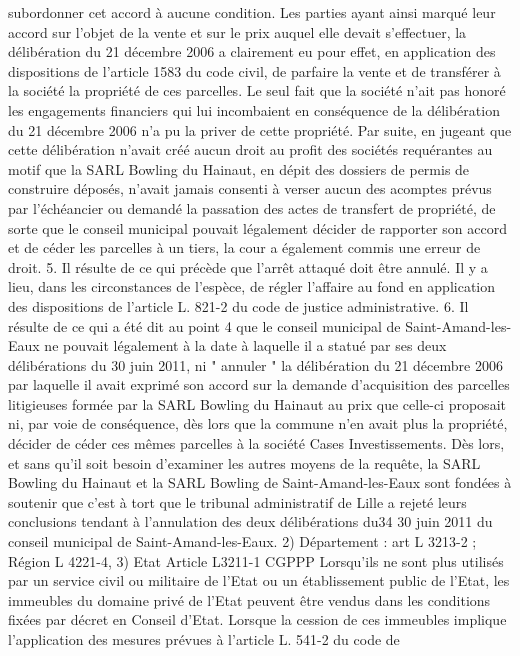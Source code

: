 \documentclass[11pt,a4paper]{report}
\begin{document}
	subordonner cet accord à aucune condition. Les parties ayant ainsi marqué leur accord sur l'objet de la vente
	et sur le prix auquel elle devait s'effectuer, la délibération du 21 décembre 2006 a clairement eu pour effet, en
	application des dispositions de l'article 1583 du code civil, de parfaire la vente et de transférer à la société la
	propriété de ces parcelles. Le seul fait que la société n'ait pas honoré les engagements financiers qui lui
	incombaient en conséquence de la délibération du 21 décembre 2006 n'a pu la priver de cette propriété. Par
	suite, en jugeant que cette délibération n'avait créé aucun droit au profit des sociétés requérantes au motif que
	la SARL Bowling du Hainaut, en dépit des dossiers de permis de construire déposés, n'avait jamais consenti à
	verser aucun des acomptes prévus par l'échéancier ou demandé la passation des actes de transfert de propriété,
	de sorte que le conseil municipal pouvait légalement décider de rapporter son accord et de céder les parcelles à
	un tiers, la cour a également commis une erreur de droit.
	5. Il résulte de ce qui précède que l'arrêt attaqué doit être annulé. Il y a lieu, dans les circonstances de l'espèce,
	de régler l'affaire au fond en application des dispositions de l'article L. 821-2 du code de justice administrative.
	6. Il résulte de ce qui a été dit au point 4 que le conseil municipal de Saint-Amand-les-Eaux ne pouvait
	légalement à la date à laquelle il a statué par ses deux délibérations du 30 juin 2011, ni " annuler " la
	délibération du 21 décembre 2006 par laquelle il avait exprimé son accord sur la demande d'acquisition des
	parcelles litigieuses formée par la SARL Bowling du Hainaut au prix que celle-ci proposait ni, par voie de
	conséquence, dès lors que la commune n'en avait plus la propriété, décider de céder ces mêmes parcelles à la
	société Cases Investissements. Dès lors, et sans qu'il soit besoin d'examiner les autres moyens de la requête, la
	SARL Bowling du Hainaut et la SARL Bowling de Saint-Amand-les-Eaux sont fondées à soutenir que c'est à tort
	que le tribunal administratif de Lille a rejeté leurs conclusions tendant à l'annulation des deux délibérations du34
	30 juin 2011 du conseil municipal de Saint-Amand-les-Eaux.
	2) Département : art L 3213-2 ; Région L 4221-4,
	3) Etat Article L3211-1 CGPPP Lorsqu'ils ne sont plus utilisés par un service civil ou militaire de l'Etat ou un
	établissement public de l'Etat, les immeubles du domaine privé de l'Etat peuvent être vendus dans les conditions
	fixées par décret en Conseil d'Etat.
	Lorsque la cession de ces immeubles implique l'application des mesures prévues à l'article L. 541-2 du code de
\end{document}
